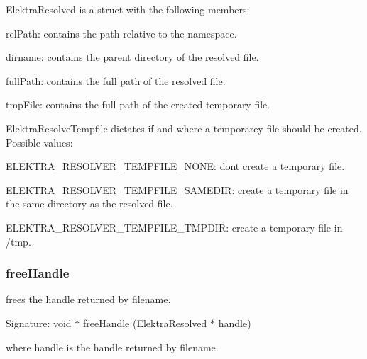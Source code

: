 {\ttfamily Elektra\+Resolved} is a struct with the following members\+:
\begin{DoxyItemize}
\item {\ttfamily rel\+Path}\+: contains the path relative to the namespace.
\item {\ttfamily dirname}\+: contains the parent directory of the resolved file.
\item {\ttfamily full\+Path}\+: contains the full path of the resolved file.
\item {\ttfamily tmp\+File}\+: contains the full path of the created temporary file.
\end{DoxyItemize}

{\ttfamily Elektra\+Resolve\+Tempfile} dictates if and where a temporarey file should be created. Possible values\+:
\begin{DoxyItemize}
\item {\ttfamily E\+L\+E\+K\+T\+R\+A\+\_\+\+R\+E\+S\+O\+L\+V\+E\+R\+\_\+\+T\+E\+M\+P\+F\+I\+L\+E\+\_\+\+N\+O\+NE}\+: don\textquotesingle{}t create a temporary file.
\item {\ttfamily E\+L\+E\+K\+T\+R\+A\+\_\+\+R\+E\+S\+O\+L\+V\+E\+R\+\_\+\+T\+E\+M\+P\+F\+I\+L\+E\+\_\+\+S\+A\+M\+E\+D\+IR}\+: create a temporary file in the same directory as the resolved file.
\item {\ttfamily E\+L\+E\+K\+T\+R\+A\+\_\+\+R\+E\+S\+O\+L\+V\+E\+R\+\_\+\+T\+E\+M\+P\+F\+I\+L\+E\+\_\+\+T\+M\+P\+D\+IR}\+: create a temporary file in {\ttfamily /tmp}.
\end{DoxyItemize}

\subsubsection*{free\+Handle}

frees the handle returned by {\ttfamily filename}.

Signature\+: {\ttfamily void $\ast$ free\+Handle (Elektra\+Resolved $\ast$ handle)}

where {\ttfamily handle} is the handle returned by {\ttfamily filename}. 
